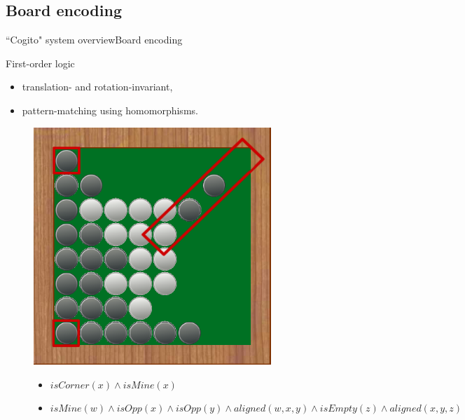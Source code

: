 \subsection{Board encoding}

\begin{frame}{``Cogito" system overview}{Board encoding}

\begin{block}{First-order logic}
  \begin{itemize}
    \item translation- and rotation-invariant,
    \item pattern-matching using homomorphisms.
  \end{itemize}
\end{block}
\pause
\begin{figure}[ht]
  \begin{minipage}[t]{0.4\linewidth}
    \vspace{0pt}
    \centering
    \includegraphics[width=0.8\textwidth]{img/cogito/raisonneur_choix_2}	
  \end{minipage}
  \hfill
  \begin{minipage}[t]{0.55\textwidth}
    \vspace{0pt}
    \begin{itemize}
	\item $isCorner(x) \wedge isMine(x)$
	\item $isMine(w) \wedge isOpp(x) \wedge isOpp(y) 
		  \wedge aligned(w,x,y) \wedge isEmpty(z) 
		  \wedge aligned (x,y,z)$
    \end{itemize}
  \end{minipage}
\end{figure}

\end{frame}

